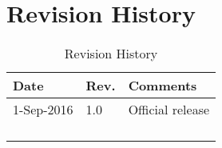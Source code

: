 \chapter{Revision History}\label{revision-history}

\begin{longtable}[]{@{}lll@{}}
\toprule
Date & Rev. & Comments\tabularnewline
\midrule
\endhead
1-Sep-2016 & 1.0 & Official release\tabularnewline
& &\tabularnewline
& &\tabularnewline
& &\tabularnewline
\bottomrule
\caption{Revision History}
\end{longtable}